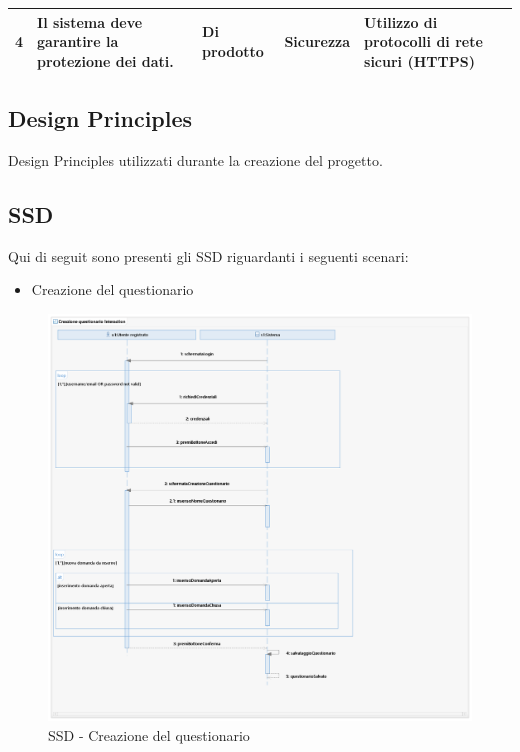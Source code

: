 \documentclass[12pt]{article}
\begin{document}
\begin{table}[H]
\begin{adjustbox}{max width=1.1\textwidth,center}
\begin{tabular}{lllll}
\multicolumn{1}{|l|}{4}                                                          & \multicolumn{1}{l|}{Il sistema deve garantire la protezione dei dati.}                   & \multicolumn{1}{l|}{Di prodotto}                                                  & \multicolumn{1}{l|}{Sicurezza}                                                      & \multicolumn{1}{l|}{Utilizzo di protocolli di rete sicuri (HTTPS)}                     \\ \hline
\end{tabular}
\endgroup
\end{adjustbox}
\end{table}


\subsection{Design Principles}
Design Principles utilizzati durante la creazione del progetto.

\subsection{SSD}
Qui di seguit sono presenti gli SSD riguardanti i seguenti scenari:
\begin{itemize}
\item Creazione del questionario
\end{itemize}

\begin{figure}[H]
\includegraphics[scale=0.5, left]{UNIMIBModule_CreazionequestionarioSequenceDiagram.png}
\caption{SSD - Creazione del questionario}
\end{figure}
\end{document}
